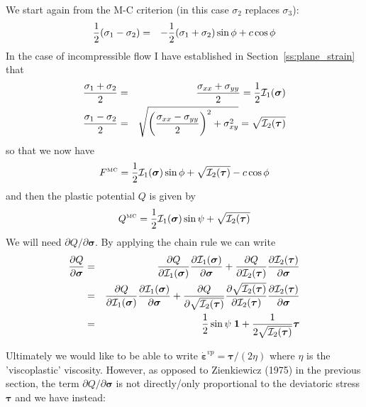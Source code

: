 We start again from the M-C criterion (in this case $\sigma_2$ replaces $\sigma_3$):
\begin{eqnarray}
\frac{1}{2}(\sigma_1-\sigma_2) &=& - \frac{1}{2}(\sigma_1+\sigma_2)  \sin \phi + c \cos \phi  \nonumber\\
\end{eqnarray}
In the case of incompressible flow I have established in Section~\ref{ss:plane_strain} that 
\begin{eqnarray}
\frac{\sigma_1+\sigma_2}{2} &=& \frac{\sigma_{xx}+\sigma_{yy}}{2} = \frac12 {\cal I}_1(\bm\sigma)\\
\frac{\sigma_1-\sigma_2}{2} &=& \sqrt{ \left(\frac{\sigma_{xx}-\sigma_{yy}}{2}\right)^2 + \sigma_{xy}^2  }
=\sqrt{ {\cal I}_2(\bm\tau)  }
\end{eqnarray}
so that we now have
\[
F^{\text{\tiny MC}} 
= \frac{1}{2}{\cal I}_1(\bm\sigma) \sin\phi  + 
\sqrt{ {\cal I}_2(\bm\tau)  }
-c \cos \phi 
\]
and then the plastic potential $Q$ is given by
\[
Q^{\text{\tiny MC}}=\frac{1}{2}{\cal I}_1(\bm\sigma) \sin\psi  + \sqrt{ {\cal I}_2(\bm\tau)  }
\]
We will need $\partial Q/\partial \bm\sigma$.
By applying the chain rule we can write
\begin{eqnarray}
\frac{\partial Q}{\partial \bm\sigma} 
&=&
\frac{\partial Q}{\partial {\cal I}_1(\bm\sigma)} 
\frac{\partial {\cal I}_1(\bm\sigma)}{\partial \bm\sigma} 
+
\frac{\partial Q}{\partial {\cal I}_2(\bm\tau)} 
\frac{\partial {\cal I}_2(\bm\tau)}{\partial \bm\sigma} \nonumber\\
&=&
\frac{\partial Q}{\partial {\cal I}_1(\bm\sigma)} 
\frac{\partial {\cal I}_1(\bm\sigma)}{\partial \bm\sigma} 
+
\frac{\partial Q}{\partial \sqrt{{\cal I}_2(\bm\tau)}} 
\frac{\partial \sqrt{ {\cal I}_2(\bm\tau)}   }{\partial {\cal I}_2(\bm\tau)} 
\frac{\partial {\cal I}_2(\bm\tau)}{\partial \bm\sigma} \nonumber\\
&=&
\frac12 \sin\psi \; {\bm 1} + \frac{1}{2 \sqrt{ {\cal I}_2(\bm\tau)}} 
\bm\tau
\end{eqnarray}

Ultimately we would like to be able to write $\dot{\bm \varepsilon}^{vp} = \bm\tau /(2\eta)$
where $\eta$ is the 'viscoplastic' viscosity. However, as opposed to Zienkiewicz (1975) in the 
previous section, the term $\partial Q/\partial \bm\sigma$
is not directly/only proportional to the deviatoric stress $\bm\tau$ and we have instead:

